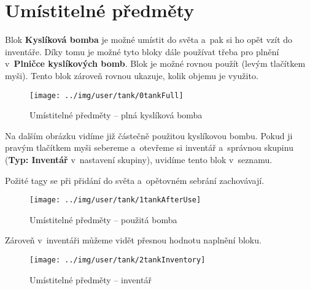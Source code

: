
\section{Umístitelné předměty}

Blok \textbf{Kyslíková bomba} je možné umístit do světa a~pak si ho opět vzít do inventáře. Díky tomu je možné tyto bloky dále používat třeba pro plnění v~\textbf{Plničce kyslíkových bomb}.
Blok je možné rovnou použít (levým tlačítkem myši).
Tento blok zároveň rovnou ukazuje, kolik objemu je využito.

\begin{figure}[!ht]\centering
\texttt{[image: ../img/user/tank/0tankFull]}

\caption{Umístitelné předměty -- plná kyslíková bomba}
\label{fig:user_tank_0tankFull}

\end{figure}

\FloatBarrier

Na dalším obrázku vidíme již částečně použitou kyslíkovou bombu. Pokud ji pravým tlačítkem myši sebereme a~otevřeme si inventář a~správnou skupinu (\textbf{Typ: Inventář} v~nastavení skupiny), uvidíme tento blok v~seznamu.

Požité tagy se při přidání do světa a~opětovném sebrání zachovávají.

\begin{figure}[!ht]\centering
\texttt{[image: ../img/user/tank/1tankAfterUse]}

\caption{Umístitelné předměty -- použitá bomba}
\label{fig:user_tank_1tankAfterUse}

\end{figure}

\FloatBarrier

Zároveň v~inventáři můžeme vidět přesnou hodnotu naplnění bloku.

\begin{figure}[!ht]\centering
\texttt{[image: ../img/user/tank/2tankInventory]}

\caption{Umístitelné předměty -- inventář}
\label{fig:user_tank_2tankInventory}

\end{figure}



\FloatBarrier